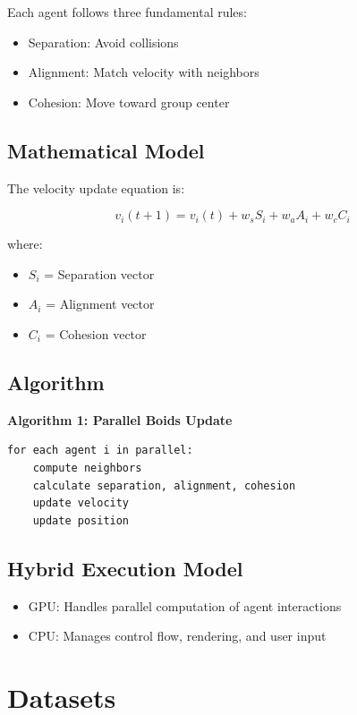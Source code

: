 \documentclass[12pt,a4paper]{report}
\begin{document}
Each agent follows three fundamental rules:

\begin{itemize}
\item Separation: Avoid collisions
\item Alignment: Match velocity with neighbors
\item Cohesion: Move toward group center
\end{itemize}

\section{Mathematical Model}

The velocity update equation is:

\[
v_i(t+1) = v_i(t) + w_s S_i + w_a A_i + w_c C_i
\]

where:
\begin{itemize}
\item $S_i$ = Separation vector
\item $A_i$ = Alignment vector
\item $C_i$ = Cohesion vector
\end{itemize}

\section{Algorithm}

\textbf{Algorithm 1: Parallel Boids Update}

\begin{verbatim}
for each agent i in parallel:
    compute neighbors
    calculate separation, alignment, cohesion
    update velocity
    update position
\end{verbatim}

\section{Hybrid Execution Model}

\begin{itemize}
\item GPU: Handles parallel computation of agent interactions
\item CPU: Manages control flow, rendering, and user input
\end{itemize}

\chapter{Datasets}
\end{document}
